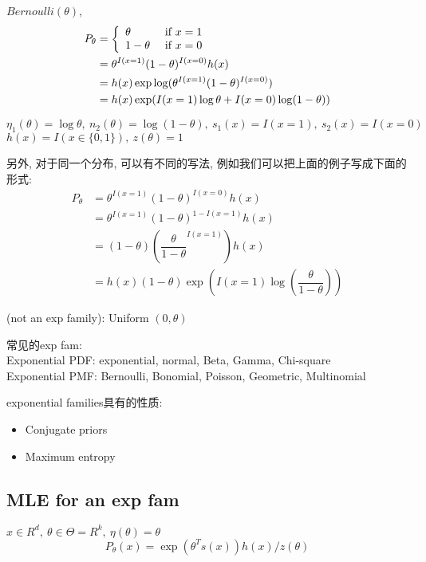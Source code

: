 \documentclass{article}
\begin{document}
\begin{example}
$Bernoulli(\theta)$,
$$
\begin{aligned}
P_\theta 
& = \left\{
  \begin{array}{ll}
	\theta & \textrm{\ if } x = 1 \\
	1 - \theta & \textrm{\ if } x=0
  \end{array}
\right. \\
& = \theta^{I(x = 1)} (1 - \theta)^{I(x = 0)} h(x) \\
& = h(x) \exp \log (\theta^{I(x = 1)} (1 - \theta)^{I(x = 0)})\\
& = h(x) \exp (I(x=1) \log \theta + I(x=0) \log (1 - \theta))
\end{aligned}
$$

$\eta_1(\theta) = \log \theta,\ n_2(\theta) = \log (1 - \theta),\ s_1(x) = I(x=1),\ s_2(x) = I(x=0)$\\
$h(x) = I(x \in \{0,1\}),\ z(\theta) = 1$

另外, 对于同一个分布, 可以有不同的写法, 例如我们可以把上面的例子写成下面的形式:
$$
\begin{aligned}
P_\theta 
& = \theta^{I(x = 1)} (1 - \theta)^{I(x = 0)} h(x) \\
& = \theta^{I(x = 1)} (1 - \theta)^{1 - I(x = 1)} h(x)\\
& = (1 - \theta)(\dfrac{\theta}{1-\theta}^{I(x=1)}) h(x) \\
& = h(x) (1 - \theta) \exp(I(x=1) \log(\dfrac{\theta}{1-\theta}))
\end{aligned}
$$
\end{example}

\begin{example}
(not an exp family): Uniform $(0, \theta)$
\end{example}

常见的exp fam:\\
Exponential PDF: exponential, normal, Beta, Gamma, Chi-square\\
Exponential PMF: Bernoulli, Bonomial, Poisson, Geometric, Multinomial

exponential families具有的性质:
\begin{itemize}
\item Conjugate priors
\item Maximum entropy
\end{itemize}

\subsection{MLE for an exp fam}
$x \in R^d,\ \theta \in \Theta=R^k,\ \eta(\theta) = \theta$
$$P_\theta(x) = \exp(\theta^T s(x)) h(x)/z(\theta)$$
\end{document}
